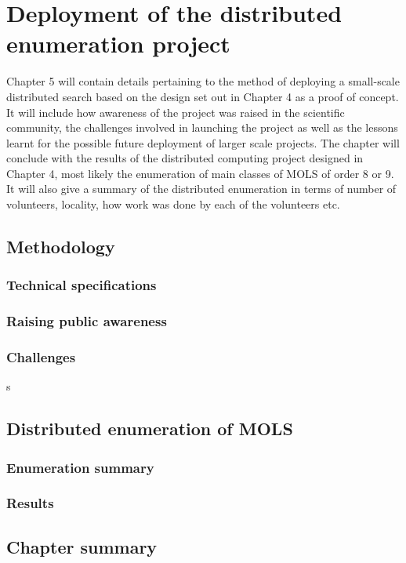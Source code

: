 \chapter{Deployment of the distributed enumeration project}
\vspace{-2em}
\minitoc

Chapter 5 will contain details pertaining to the method of deploying a small-scale distributed search based on the design set out in Chapter 4 as a proof of concept.  It will include how awareness of the project was raised in the scientific community, the  challenges involved in launching the project as well as the lessons learnt for the possible future deployment of larger scale projects.  The chapter will conclude with the results of the distributed computing project designed in Chapter 4, most likely the enumeration of main classes of MOLS of order 8 or 9.  It will also give a summary of the distributed enumeration in terms of number of volunteers, locality, how work was done by each of the volunteers etc. 

\section{Methodology}

\subsection{Technical specifications}
\subsection{Raising public awareness}
\subsection{Challenges}

s\\
\section{Distributed enumeration of MOLS}
\subsection{Enumeration summary}
\subsection{Results}

\section{Chapter summary}
